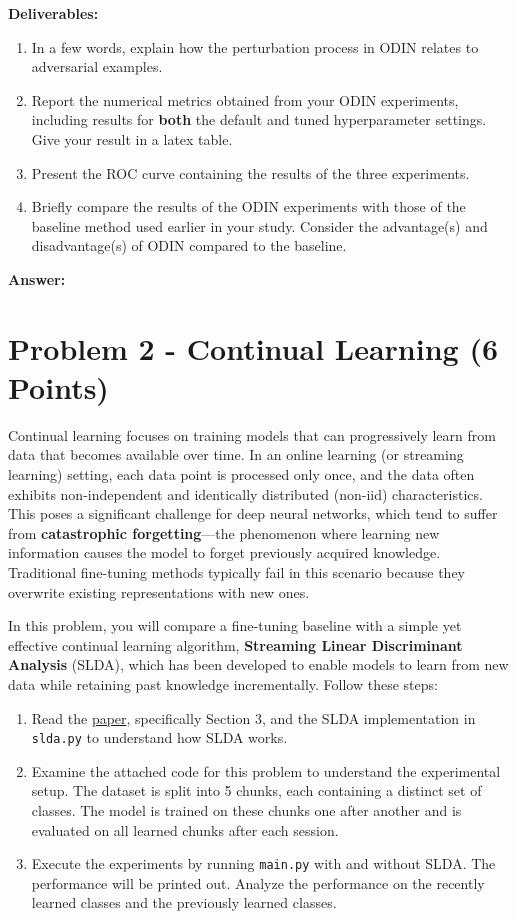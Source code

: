 \documentclass[11pt, oneside]{article}   	%
\begin{document}
\textbf{Deliverables:}
\begin{enumerate}
    \item In a few words, explain how the perturbation process in ODIN relates to adversarial examples.
    \item Report the numerical metrics obtained from your ODIN experiments, including results for \textbf{both} the default and tuned hyperparameter settings. Give your result in a latex table. 
    \item Present the ROC curve containing the results of the three experiments. 
    \item Briefly compare the results of the ODIN experiments with those of the baseline method used earlier in your study. Consider the advantage(s) and disadvantage(s) of ODIN compared to the baseline.

\end{enumerate}

\textbf{Answer:} \\



\section*{Problem 2 - Continual Learning (6 Points)}
Continual learning focuses on training models that can progressively learn from data that becomes available over time. In an online learning (or streaming learning) setting, each data point is processed only once, and the data often exhibits non-independent and identically distributed (non-iid) characteristics. This poses a significant challenge for deep neural networks, which tend to suffer from \textbf{catastrophic forgetting}—the phenomenon where learning new information causes the model to forget previously acquired knowledge. Traditional fine-tuning methods typically fail in this scenario because they overwrite existing representations with new ones.

In this problem, you will compare a fine-tuning baseline with a simple yet effective continual learning algorithm, \textbf{Streaming Linear Discriminant Analysis} (SLDA), which has been developed to enable models to learn from new data while retaining past knowledge incrementally. Follow these steps:
\begin{enumerate}
    \item Read the \href{https://openaccess.thecvf.com/content_CVPRW_2020/papers/w15/Hayes_Lifelong_Machine_Learning_With_Deep_Streaming_Linear_Discriminant_Analysis_CVPRW_2020_paper.pdf}{paper}, specifically Section 3, and the SLDA implementation in \texttt{slda.py} to understand how SLDA works.
    \item Examine the attached code for this problem to understand the experimental setup. The dataset is split into 5 chunks, each containing a distinct set of classes. The model is trained on these chunks one after another and is evaluated on all learned chunks after each session.
    \item Execute the experiments by running \texttt{main.py} with and without SLDA. The performance will be printed out. Analyze the performance on the recently learned classes and the previously learned classes.
\end{enumerate}
\end{document}
